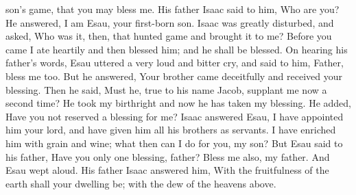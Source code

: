 {{son’s game, that you may bless me. His father Isaac said to him, Who are you? He answered, I am Esau, your first-born son. Isaac was greatly disturbed, and asked, Who was it, then, that hunted game and brought it to me? Before you came I ate heartily and then blessed him; and he shall be blessed. On hearing his father’s words, Esau uttered a very loud and bitter cry, and said to him, Father, bless me too. But he answered, Your brother came deceitfully and received your blessing. Then he said, Must he, true to his name Jacob, supplant me now a second time? He took my birthright and now he has taken my blessing. He added, Have you not reserved a blessing for me? Isaac answered Esau, I have appointed him your lord, and have given him all his brothers as servants. I have enriched him with grain and wine; what then can I do for you, my son? But Esau said to his father, Have you only one blessing, father? Bless me also, my father. And Esau wept aloud. His father Isaac answered him, With the fruitfulness of the earth shall your dwelling be; with the dew of the heavens above.
  }
}

